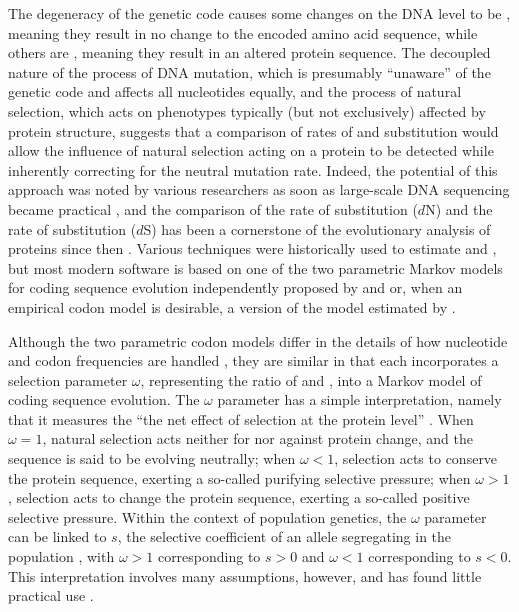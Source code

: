 The degeneracy of the genetic code causes some changes on the DNA
level to be \syn, meaning they result in no change to the encoded
amino acid sequence, while others are \nsyn, meaning they result in an
altered protein sequence. The decoupled nature of the process of DNA
mutation, which is presumably ``unaware'' of the genetic code and
affects all nucleotides equally, and the process of natural selection,
which acts on phenotypes typically (but not exclusively) affected by
protein structure, suggests that a comparison of rates of \nsyn and
\syn substitution would allow the influence of natural selection
acting on a protein to be detected while inherently correcting for the
neutral mutation rate. Indeed, the potential of this approach was
noted by various researchers as soon as large-scale DNA sequencing
became practical \citep{Kimura1977,Jukes1979}, and the comparison of
the rate of \nsyn substitution ($d$N) and the rate of \syn
substitution ($d$S) has been a cornerstone of the evolutionary
analysis of proteins since then \citep{Yang2006}. Various techniques
were historically used to estimate \dn and \ds \citep{Yang2000c}, but
most modern software is based on one of the two parametric Markov
models for coding sequence evolution independently proposed by
\citet{Goldman1994a} and \citet{Muse1994} or, when an empirical codon
model is desirable, a version of the model estimated by
\citet{Kosiol2007}.

Although the two parametric codon models differ in the details of how
nucleotide and codon frequencies are handled
\citep{Yang2000c,Bierne2003a}, they are similar in that each
incorporates a selection parameter $\omega$, representing the ratio of
\dn and \ds, into a Markov model of coding sequence evolution. The
$\omega$ parameter has a simple interpretation, namely that it
measures the ``the net effect of selection at the protein level''
\citep{Yang2000CodonSubstitution}. When $\omega=1$, natural selection
acts neither for nor against protein change, and the sequence is said
to be evolving neutrally; when $\omega<1$, selection acts to conserve
the protein sequence, exerting a so-called purifying selective
pressure; when $\omega>1$, selection acts to change the protein
sequence, exerting a so-called positive selective pressure. Within the
context of population genetics, the $\omega$ parameter can be linked
to $s$, the selective coefficient of an allele segregating in the
population \citep{Nielsen2003,Nielsen2005b,Kryazhimskiy2008}, with
$\omega>1$ corresponding to $s>0$ and $\omega<1$ corresponding to
$s<0$. This interpretation involves many assumptions, however, and has
found little practical use \citep{Nielsen2003,Nielsen2005b}.

